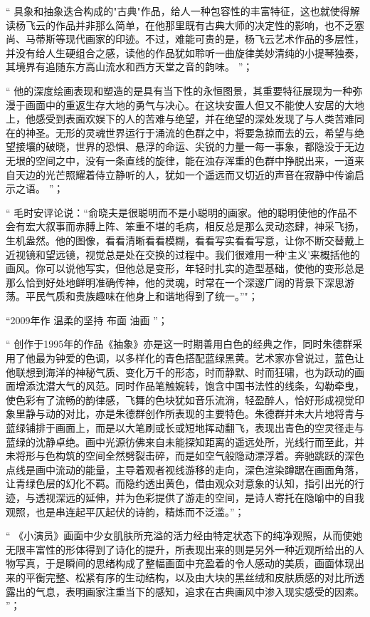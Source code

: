 \documentclass[master,oneside]{zjuthesis}
\begin{document}
“ 具象和抽象迭合构成的"古典"作品，给人一种包容性的丰富特征，这也就使得解读杨飞云的作品并非那么简单，在他那里既有古典大师的决定性的影响，也不乏塞尚、马蒂斯等现代画家的印迹。不过，难能可贵的是，杨飞云艺术作品的多层性，并没有给人生硬组合之感，读他的作品犹如聆听一曲旋律美妙清纯的小提琴独奏，其境界有追随东方高山流水和西方天堂之音的韵味。 ”；

“ 他的深度绘画表现和塑造的是具有当下性的永恒图景，其重要特征展现为一种弥漫于画面中的重返生存大地的勇气与决心。在这块安置人但又不能使人安居的大地上，他感受到表面欢娱下的人的苦难与绝望，并在绝望的深处发现了与人类苦难同在的神圣。无形的灵魂世界运行于涌流的色群之中，将要急掠而去的云，希望与绝望接壤的破晓，世界的恐惧、悬浮的命运、尖锐的力量一每一事象，都隐没于无边无垠的空间之中，没有一条直线的旋律，能在浊存浑重的色群中挣脱出来，一道来自天边的光芒照耀着侍立静听的人，犹如一个遥远而又切近的声音在寂静中传谕启示之语。 ”；

“ 毛时安评论说：“俞晓夫是很聪明而不是小聪明的画家。他的聪明使他的作品不会有宏大叙事而赤膊上阵、笨重不堪的毛病，相反总是那么灵动恣肆，神采飞扬，生机盎然。他的图像，看看清晰看看模糊，看看写实看看写意，让你不断交替戴上近视镜和望远镜，视觉总是处在交换的过程中。我们很难用一种‘主义’来概括他的画风。你可以说他写实，但他总是变形，年轻时扎实的造型基础，使他的变形总是那么恰到好处地鲜明准确传神，他的灵魂，时常在一个深邃广阔的背景下深思游荡。平民气质和贵族趣味在他身上和谐地得到了统一。”"；

“2009年作 温柔的坚持 布面 油画 ”；

“ 创作于1995年的作品《抽象》亦是这一时期善用白色的经典之作，同时朱德群采用了他最为钟爱的色调，以多样化的青色搭配蓝绿黑黄。艺术家亦曾说过，蓝色让他联想到海洋的神秘气质、变化万千的形态，时而静默、时而狂啸，也为跃动的画面增添沈潜大气的风范。同时作品笔触婉转，饱含中国书法性的线条，勾勒牵曳，使色彩有了流畅的韵律感，飞舞的色块犹如音乐流淌，轻盈醉人，恰好形成视觉印象里静与动的对比，亦是朱德群创作所表现的主要特色。朱德群并未大片地将青与蓝绿铺排于画面上，而是以大笔刷或长或短地挥动翻飞，表现出青色的空灵径走与蓝绿的沈静卓绝。画中光源彷佛来自未能探知距离的遥远处所，光线行而至此，并未将形与色构筑的空间全然劈裂击碎，而是如空气般隐动漂浮着。奔驰跳跃的深色点线是画中流动的能量，主导着观者视线游移的走向，深色渲染蹲踞在画面角落，让青绿色层的幻化不羁。而隐约透出黄色，借由观众对意象的认知，指引出光的行迹，与透视深远的延伸，并为色彩提供了游走的空间，是诗人寄托在隐喻中的自我观照，也是串连起平仄起伏的诗韵，精炼而不泛滥。”；

“ 《小演员》画面中少女肌肤所充溢的活力经由特定状态下的纯净观照，从而使她无限丰富性的形体得到了诗化的提升，所表现出来的则是另外一种近观所给出的人物写真，于是瞬间的思绪构成了整幅画面中充盈着的令人感动的美质，画面体现出来的平衡完整、松紧有序的生动结构，以及由大块的黑丝绒和皮肤质感的对比所透露出的气息，表明画家注重当下的感知，追求在古典画风中渗入现实感受的因素。 ”；
\end{document}
